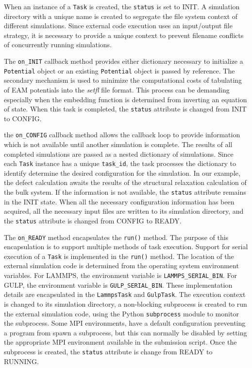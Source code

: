 When an instance of a \verb|Task| is created, the \verb|status| is set to INIT.  A simulation directory with a unique name is created to segregate the file system context of different simulations.  Since external code execution uses an input/output file strategy, it is necessary to provide a unique context to prevent filename conflicts of concurrently running simulations.

The \verb|on_INIT| callback method provides either dictionary necessary to initialize a \verb|Potential| object or an existing \verb|Potential| object is passed by reference.  The secondary mechanism is used to minimize the computational costs of tabulating of EAM potentials into the \emph{setfl} file format.  This process can be demanding especially when the embedding function is determined from inverting an equation of state.  When this task is completed, the \verb|status| attribute is changed from INIT to CONFIG.

the \verb|on_CONFIG| callback method allows the callback loop to provide information which is not available until another simulation is complete.  The results of all completed simulations are passed as a nested dictionary of simulations.  Since each \verb|Task| instance has a unique \verb|task_id|, the task processes the dictionary to identify determine the desired configuration for the simulation.  In our example, the defect calculation awaits the results of the structural relaxation calculation of the bulk system.  If the information is not available, the \verb|status| attribute remains in the INIT state.  When all the necessary configuration information has been acquired, all the necessary input files are written to its simulation directory, and the \verb|status| attribute is changed from CONFIG to READY.

The \verb|on_READY| method encapsulates the \verb|run()| method.  The purpose of this encapsulation is to support multiple methods of task execution.  Support for serial execution of a \verb|Task| is implemented in the \verb|run()| method.  The  location of the external simulation code is determined from the operating system environment variables.  For LAMMPS, the environment variable is \verb|LAMMPS_SERIAL_BIN|.  For GULP, the environment variable is \verb|GULP_SERIAL_BIN|.  These implementation details are encapsulated in the \verb|LammpsTask| and \verb|GulpTask|.  The execution context is changed to its simulation directory, a non-blocking subprocess is created to run the external simulation code, using the Python \verb|subprocess| module to monitor the subprocess.  Some MPI environments, have a default configuration preventing a program from spawn a subprocess, but this can normally be disabled by setting the appropriate MPI environment available in the submission script.  Once the subprocess is created, the \verb|status| attribute is change from READY to RUNNING.


